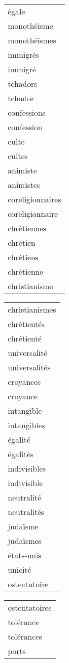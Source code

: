 \begin{table}[h]
\begin{center}
\begin{tabular}{|l|}
\hline
égale\footnotemark[1]\\
monothéisme\\
monothéismes\\
immigrés\\
immigré\\
tchadors\\
tchador\\
confessions\\
confession\\
culte\\
cultes\\
animiste\\
animistes\\
coreligionnaires\\
coreligionnaire\\
chrétiennes\\
chrétien\\
chrétiens\\
chrétienne\\
christianisme\\
\hline
	\end{tabular}
	\begin{tabular}{|l|}
\hline
christianismes\\
chrétientés\\
chrétienté\\
universalité\\
universalités\\
croyances\\
croyance\\
intangible\\
intangibles\\
égalité\\
égalités\\
indivisibles\\
indivisible\\
neutralité\\
neutralités\\
judaïsme\\
judaïsmes\\
états-unis\\
unicité\\
ostentatoire\\
\hline
	\end{tabular}
	\begin{tabular}{|l|}
\hline
ostentatoires\\
tolérance\\
tolérances\\
ports\\

\end{tabular}
\end{center}
\end{table}
